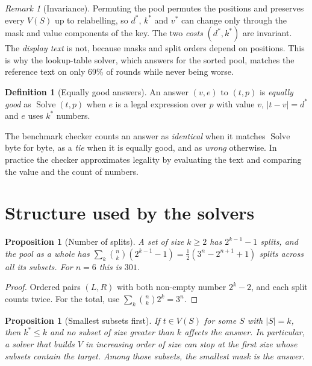 \documentclass[11pt,a4paper]{article}
\newtheorem{proposition}[theorem]{Proposition}
\theoremstyle{definition}
\newtheorem{definition}[theorem]{Definition}
\theoremstyle{remark}
\newtheorem{remark}[theorem]{Remark}
\begin{document}
\begin{remark}[Invariance]\label{rem:invariance}
Permuting the pool permutes the positions and preserves every $V(S)$ up to relabelling, so $d^*$, $k^*$ and $v^*$
can change only through the mask and value components of the key. The two \emph{costs} $(d^*, k^*)$ are
invariant. The \emph{display text} is not, because masks and split orders depend on positions. This is why
the lookup-table solver, which answers for the sorted pool, matches the reference text on only 69\% of rounds
while never being worse.
\end{remark}

\begin{definition}[Equally good answers]
An answer $(v, e)$ to $(t, p)$ is \emph{equally good} as $\operatorname{Solve}(t, p)$ when $e$ is a legal
expression over $p$ with value $v$, $|t - v| = d^*$ and $e$ uses $k^*$ numbers.
\end{definition}

The benchmark checker counts an answer as \emph{identical} when it matches $\operatorname{Solve}$ byte for byte,
as a \emph{tie} when it is equally good, and as \emph{wrong} otherwise. In practice the checker approximates
legality by evaluating the text and comparing the value and the count of numbers.

\section{Structure used by the solvers}\label{sec:structure}

\begin{proposition}[Number of splits]
A set of size $k \ge 2$ has $2^{k-1} - 1$ splits, and the pool as a whole has
$\sum_{k} \binom{n}{k} (2^{k-1} - 1) = \tfrac12 (3^n - 2^{n+1} + 1)$ splits across all its subsets. For $n = 6$ this
is $301$.
\end{proposition}

\begin{proof}
Ordered pairs $(L, R)$ with both non-empty number $2^k - 2$, and each split counts twice. For the total, use
$\sum_k \binom{n}{k} 2^k = 3^n$.
\end{proof}

\begin{proposition}[Smallest subsets first]\label{prop:early}
If $t \in V(S)$ for some $S$ with $|S| = k$, then $k^* \le k$ and no subset of size greater than $k$ affects
the answer. In particular, a solver that builds $V$ in increasing order of size can stop at the first size
whose subsets contain the target. Among those subsets, the smallest mask is the answer.
\end{proposition}
\end{document}

